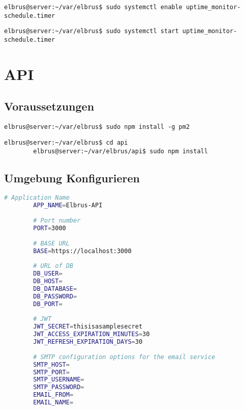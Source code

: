 \documentclass{article}
\begin{document}
	\begin{lstlisting}[caption={Aktivieren des Zeitplanungsprogrammes.}]
		elbrus@server:~/var/elbrus$ sudo systemctl enable uptime_monitor-schedule.timer
	\end{lstlisting}
	
	\begin{lstlisting}[caption={Starten des Zeitplanungsprogrammes.}]
		elbrus@server:~/var/elbrus$ sudo systemctl start uptime_monitor-schedule.timer
	\end{lstlisting}
	\newpage
	
	\section{API}
	\lstset{style=commands}

	\subsection{Voraussetzungen}
	\begin{lstlisting}[caption={Installieren von 'pm2'.}]
		elbrus@server:~/var/elbrus$ sudo npm install -g pm2
	\end{lstlisting}

	\begin{lstlisting}[caption={Nachinstallieren der Abhängigkeiten.}]
		elbrus@server:~/var/elbrus$ cd api
		elbrus@server:~/var/elbrus/api$ sudo npm install
	\end{lstlisting}
	\newpage
	\subsection[file config]{Umgebung Konfigurieren}
	
	\lstset{style=files}
	\begin{lstlisting}[caption={Anhand von '.env.example' eigene '.env' Datei anlegen.}, language=bash]
		# Application Name
		APP_NAME=Elbrus-API
		
		# Port number
		PORT=3000
		
		# BASE URL
		BASE=https://localhost:3000
		
		# URL of DB
		DB_USER=
		DB_HOST=
		DB_DATABASE=
		DB_PASSWORD=
		DB_PORT=
		
		# JWT
		JWT_SECRET=thisisasamplesecret
		JWT_ACCESS_EXPIRATION_MINUTES=30
		JWT_REFRESH_EXPIRATION_DAYS=30
		
		# SMTP configuration options for the email service
		SMTP_HOST=
		SMTP_PORT=
		SMTP_USERNAME=
		SMTP_PASSWORD=
		EMAIL_FROM=
		EMAIL_NAME=
	\end{lstlisting}
	\lstset{style=commands}
\end{document}
